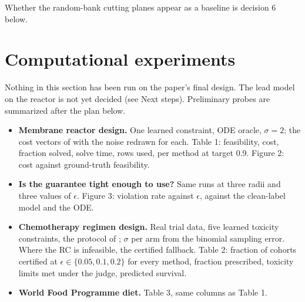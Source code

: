 \begin{outline}
Whether the random-bank cutting planes appear as a baseline is decision 6
below.
\end{outline}

\section{Computational experiments}\label{sec:experiments}

\begin{outline}
Nothing in this section has been run on the paper's final design. The lead
model on the reactor is not yet decided (see Next steps). Preliminary probes
are summarized after the plan below.
\begin{itemize}
  \item \textbf{Membrane reactor design.} One learned constraint, ODE oracle,
    $\sigma = 2$; the cost vectors of \citet{ovalle2025cmicl} with the noise
    redrawn for each. Table 1: feasibility, cost, fraction solved, solve time,
    rows used, per method at target 0.9. Figure 2: cost against ground-truth
    feasibility.
  \item \textbf{Is the guarantee tight enough to use?} Same runs at three
    radii and three values of $\epsilon$. Figure 3: violation rate against
    $\epsilon$, against the clean-label model and the ODE.
  \item \textbf{Chemotherapy regimen design.} Real trial data, five learned
    toxicity constraints, the protocol of \citet{maragno2025mixed}; $\sigma$
    per arm from the binomial sampling error. Where the RC is infeasible, the
    certified fallback. Table 2: fraction of cohorts certified at
    $\epsilon \in \{0.05, 0.1, 0.2\}$ for every method, fraction prescribed,
    toxicity limits met under the judge, predicted survival.
  \item \textbf{World Food Programme diet.} Table 3, same columns as Table 1.
\end{itemize}
\end{outline}

